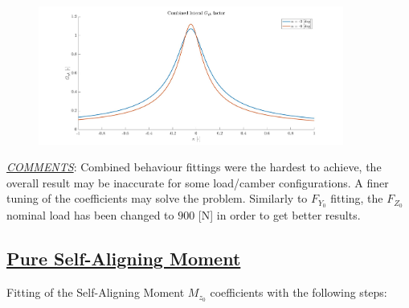 \documentclass{IEEEtran}
\begin{document}
\begin{itemize}
        \begin{figure}[!h]
            \centerline{\includegraphics[width = 3.95in]{combined_lateral_2.jpg}}
            
            \label{fig:Gyk}
        \end{figure}
    \end{itemize}
    
    \textit{\underline{COMMENTS}}: Combined behaviour fittings were the hardest to achieve, the overall result may be inaccurate for some load/camber configurations. A finer tuning of the coefficients may solve the problem. Similarly to $F_{Y_0}$ fitting, the $F_{Z_0}$ nominal load has been changed to $900$ [N] in order to get better results.
    \newpage
    \subsection{\textbf{\underline{Pure Self-Aligning Moment}}}
    Fitting of the Self-Aligning Moment $M_{z_0}$ coefficients with the following steps:
                
\end{document}
